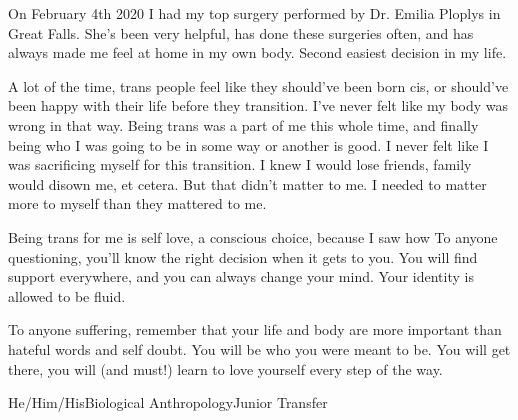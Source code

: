 {On February 4th 2020 I had my top surgery performed by Dr. Emilia Ploplys in 
Great Falls. She's been very helpful, has done these surgeries often, and has
always made me feel at home in my own body. Second easiest decision in my life.

A lot of the time, trans people feel like they should've been born cis, or
should've been happy with their life before they transition. I've never felt
like my body was wrong in that way. Being trans was a part of me this whole
time, and finally being who I was going to be in some way or another is good. I
never felt like I was sacrificing myself for this transition. I knew I would
lose friends, family would disown me, et cetera. But that didn't matter to me.
I needed to matter more to myself than they mattered to me.

Being trans for me is self love, a conscious choice, because I saw how
To anyone questioning, you'll know the right decision when it gets to you. You
will find support everywhere, and you can always change your mind. Your
identity is allowed to be fluid.

To anyone suffering, remember that your life and body are more important than
hateful words and self doubt. You will be who you were meant to be. You will
get there, you will (and must!) learn to love yourself every step of the way.}
{He/Him/His}{Biological Anthropology}{Junior Transfer}
{} %
